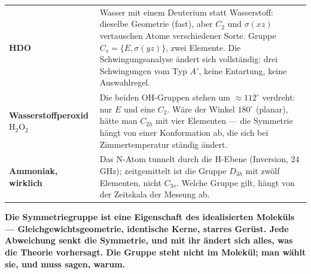 \begin{warnung}
\begin{center}
{\small
\renewcommand{\arraystretch}{1.5}
\begin{tabular}{@{}P{3.0cm}P{5.8cm}@{}}
\toprule
\textbf{HDO} & Wasser mit einem Deuterium statt Wasserstoff: dieselbe Geometrie (fast), aber $C_2$ und $\sigma(xz)$ vertauschen Atome verschiedener Sorte. Gruppe $C_s = \{E, \sigma(yz)\}$, zwei Elemente. Die Schwingungsanalyse ändert sich vollständig: drei Schwingungen vom Typ $A'$, keine Entartung, keine Auswahlregel.\\
\textbf{Wasserstoff\-peroxid $\mathrm H_2\mathrm O_2$} & Die beiden OH-Gruppen stehen um $\approx112^{\circ}$ verdreht: nur $E$ und eine $C_2$. Wäre der Winkel $180^{\circ}$ (planar), hätte man $C_{2h}$ mit vier Elementen --- die Symmetrie hängt von einer Konformation ab, die sich bei Zimmertemperatur ständig ändert.\\
\textbf{Ammoniak, wirklich} & Das N-Atom tunnelt durch die H-Ebene (Inversion, $24$ GHz); zeitgemittelt ist die Gruppe $D_{3h}$ mit zwölf Elementen, nicht $C_{3v}$. Welche Gruppe gilt, hängt von der Zeitskala der Messung ab.\\
\bottomrule
\end{tabular}}
\end{center}

\begin{center}
\begin{minipage}{0.9\textwidth}
\textbf{Die Symmetriegruppe ist eine Eigenschaft des idealisierten Moleküls --- Gleichgewichtsgeometrie, identische Kerne, starres Gerüst. Jede Abweichung senkt die Symmetrie, und mit ihr ändert sich alles, was die Theorie vorhersagt. Die Gruppe steht nicht im Molekül; man wählt sie, und muss sagen, warum.}
\end{minipage}
\end{center}

\begin{center}
\begin{minipage}{0.88\textwidth}
\end{minipage}
\end{center}
\end{warnung}

